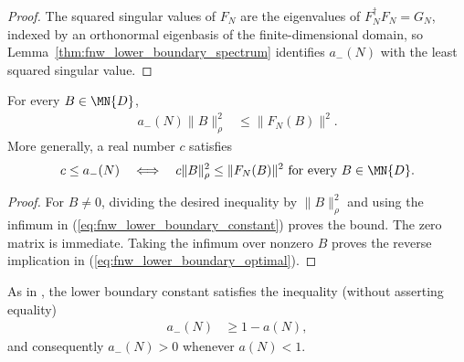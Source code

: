 \begin{proof}
    \leanok
    The squared singular values of $F_N$ are the eigenvalues of
    $F_N^\dagger F_N=G_N$, indexed by an orthonormal eigenbasis of the
    finite-dimensional domain, so
    Lemma~\ref{thm:fnw_lower_boundary_spectrum} identifies $a_-(N)$ with the
    least squared singular value.
\end{proof}

\begin{lemma}
    \label{thm:fnw_lower_boundary_optimal}
    \leanok
    For every $B\in\MN{D}$,
    \begin{align}
        a_-(N)\lVert B\rVert_\rho^2
         & \leq\lVert F_N(B)\rVert^2.
        \label{eq:fnw_lower_boundary_universal}
    \end{align}
    More generally, a real number $c$ satisfies
    \begin{align}
        c\leq a_-(N)
        \quad\Longleftrightarrow\quad
        c\lVert B\rVert_\rho^2
        \leq\lVert F_N(B)\rVert^2
        \text{ for every }B\in\MN{D}.
        \label{eq:fnw_lower_boundary_optimal}
    \end{align}
\end{lemma}

\begin{proof}
    \leanok
    For $B\neq0$, dividing the desired inequality by
    $\lVert B\rVert_\rho^2$ and using the infimum in
    (\ref{eq:fnw_lower_boundary_constant}) proves the bound. The zero matrix is
    immediate. Taking the infimum over nonzero $B$ proves the reverse
    implication in (\ref{eq:fnw_lower_boundary_optimal}).
\end{proof}

\begin{lemma}
    \label{thm:fnw_lower_boundary_estimate}
    \leanok
    As in \cite[Lemma~5.3]{Fannes1992Finitely}, the lower boundary constant
    satisfies the inequality (without asserting equality)
    \begin{align}
        a_-(N) & \geq1-a(N),
        \label{eq:fnw_lower_boundary_one_sub}
    \end{align}
    and consequently $a_-(N)>0$ whenever $a(N)<1$.
\end{lemma}

